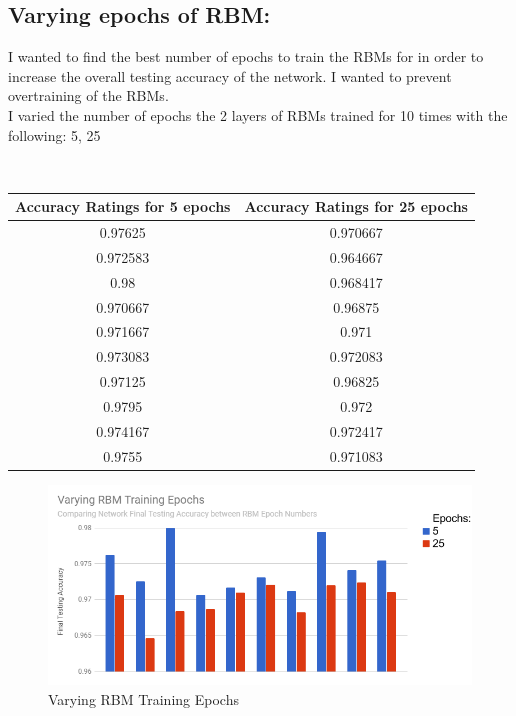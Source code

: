 \documentclass[a4paper]{article}
\begin{document}
\subsection{Varying epochs of RBM:}
\hspace*{10mm}
I wanted to find the best number of epochs to train the RBMs for in order to increase the overall testing accuracy of the network. I wanted to prevent overtraining of the RBMs.\\
\hspace*{10mm}
I varied the number of epochs the 2 layers of RBMs trained for 10 times with the following: 5, 25
\begin{center} \
 \begin{tabular}{||c c||} 
 \hline
Accuracy Ratings for 5 epochs&
Accuracy Ratings for 25 epochs\\[0.5ex]\hline\hline
0.97625&
0.970667\\ 
 \hline


0.972583&
0.964667\\ 
 \hline


0.98&
0.968417\\ 
 \hline


0.970667&
0.96875\\ 
 \hline


0.971667&
0.971\\ 
 \hline


0.973083&
0.972083\\ 
 \hline


0.97125&
0.96825\\ 
 \hline


0.9795&
0.972\\ 
 \hline


0.974167&
0.972417\\ 
 \hline


0.9755&
0.971083\\ 
 \hline


\end{tabular}
\pagebreak
\begin{figure}[h]
\centering
\includegraphics[width=6.5in]{varyRBMEpochs}\caption{Varying RBM Training Epochs}\label{fig:XSS}
\end{figure}
\end{center}
\end{document}
